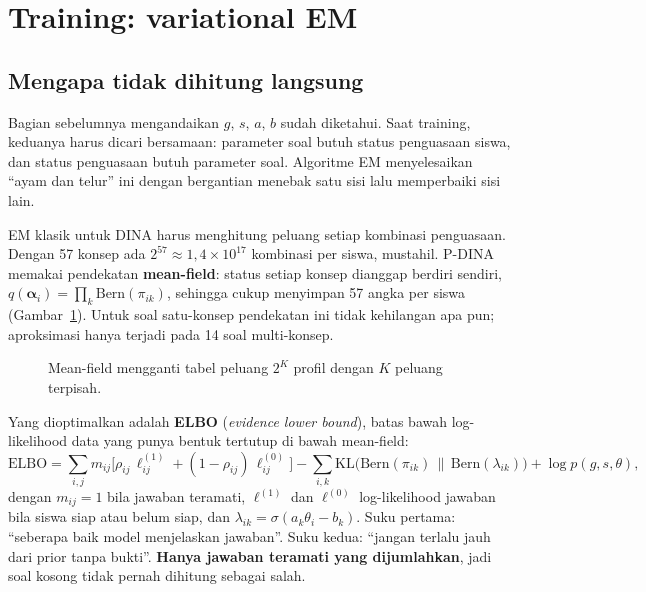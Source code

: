 \documentclass[11pt,a4paper]{article}
\begin{document}
\section{Training: variational EM}

\subsection{Mengapa tidak dihitung langsung}

Bagian sebelumnya mengandaikan $g$, $s$, $a$, $b$ sudah diketahui. Saat training, keduanya harus dicari bersamaan:
parameter soal butuh status penguasaan siswa, dan status penguasaan butuh parameter soal. Algoritme EM menyelesaikan
``ayam dan telur'' ini dengan bergantian menebak satu sisi lalu memperbaiki sisi lain.

EM klasik untuk DINA harus menghitung peluang setiap kombinasi penguasaan. Dengan 57 konsep ada
$2^{57}\approx1{,}4\times10^{17}$ kombinasi per siswa, mustahil. P-DINA memakai pendekatan \textbf{mean-field}: status
setiap konsep dianggap berdiri sendiri, $q(\boldsymbol\alpha_i)=\prod_k\mathrm{Bern}(\pi_{ik})$, sehingga cukup
menyimpan 57 angka per siswa (Gambar~\ref{fig:mf}). Untuk soal satu-konsep pendekatan ini tidak kehilangan apa pun;
aproksimasi hanya terjadi pada 14 soal multi-konsep.

\begin{figure}[h]
  \centering
  \resizebox{0.92\linewidth}{!}{}
  \caption{Mean-field mengganti tabel peluang $2^K$ profil dengan $K$ peluang terpisah.}
  \label{fig:mf}
\end{figure}

Yang dioptimalkan adalah \textbf{ELBO} (\emph{evidence lower bound}), batas bawah log-likelihood data yang punya
bentuk tertutup di bawah mean-field:
\[
  \mathrm{ELBO}=\sum_{i,j} m_{ij}\big[\rho_{ij}\,\ell^{(1)}_{ij}+(1-\rho_{ij})\,\ell^{(0)}_{ij}\big]
  -\sum_{i,k}\mathrm{KL}\big(\mathrm{Bern}(\pi_{ik})\,\|\,\mathrm{Bern}(\lambda_{ik})\big)+\log p(g,s,\theta),
\]
dengan $m_{ij}=1$ bila jawaban teramati, $\ell^{(1)}$ dan $\ell^{(0)}$ log-likelihood jawaban bila siswa siap atau
belum siap, dan $\lambda_{ik}=\sigma(a_k\theta_i-b_k)$. Suku pertama: ``seberapa baik model menjelaskan jawaban''.
Suku kedua: ``jangan terlalu jauh dari prior tanpa bukti''. \textbf{Hanya jawaban teramati yang dijumlahkan}, jadi
soal kosong tidak pernah dihitung sebagai salah.
\end{document}
